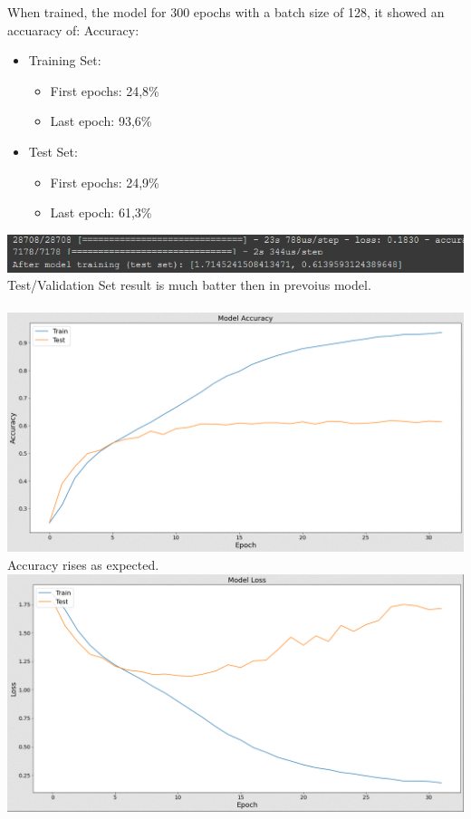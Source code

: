 When trained, the model for 300 epochs with a batch size of 128, it showed an accuaracy of:
Accuracy:
\begin{itemize}
      \item Training Set:
        \begin{itemize}
            \item First epochs: 24,8\%
            \item Last epoch: 93,6\%
        \end{itemize}
      \item Test Set:
        \begin{itemize}
            \item First epochs: 24,9\%
            \item Last epoch: 61,3\%
        \end{itemize}
\end{itemize}
\includegraphics[scale=0.9]{images/modelTwo/evalutaionTwo.png}
Test/Validation Set result is much batter then in prevoius model.\\
\\
\includegraphics[scale=0.5]{images/modelTwo/accTwo.png}
Accuracy rises as expected.\\
\newpage
\includegraphics[scale=0.5]{images/modelTwo/lossTwo.png}
